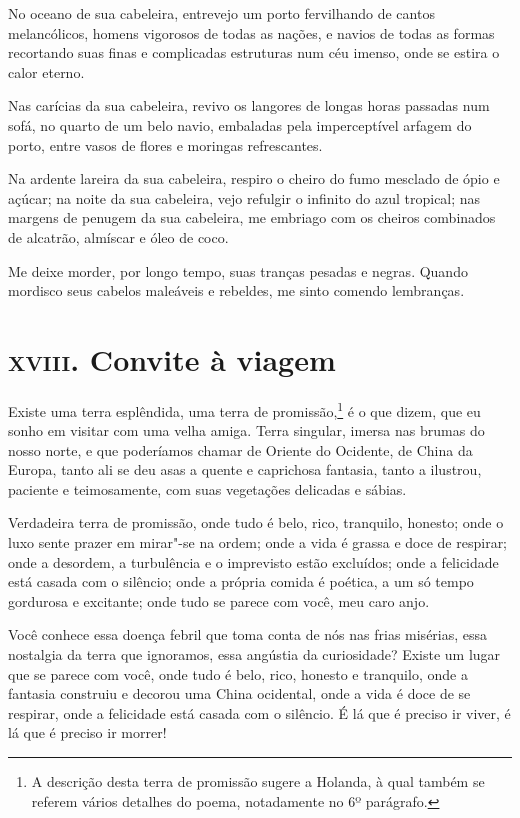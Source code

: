 No oceano de sua cabeleira, entrevejo um porto fervilhando de cantos
melancólicos, homens vigorosos de todas as nações, e navios de todas as
formas recortando suas finas e complicadas estruturas num céu imenso,
onde se estira o calor eterno.

Nas carícias da sua cabeleira, revivo os langores de longas horas
passadas num sofá, no quarto de um belo navio, embaladas pela
imperceptível arfagem do porto, entre vasos de flores e moringas
refrescantes.

Na ardente lareira da sua cabeleira, respiro o cheiro do fumo mesclado
de ópio e açúcar; na noite da sua cabeleira, vejo refulgir o infinito
do azul tropical; nas margens de penugem da sua cabeleira, me embriago
com os cheiros combinados de alcatrão, almíscar e óleo de coco.

Me deixe morder, por longo tempo, suas tranças pesadas e negras. Quando
mordisco seus cabelos maleáveis e rebeldes, me sinto comendo
lembranças.

\chapter{\textsc{xviii.} Convite à viagem}

Existe uma terra esplêndida, uma terra de promissão,\footnote{ 
 A descrição desta terra de promissão sugere a Holanda, à qual também
se referem vários detalhes do poema, notadamente no 6º parágrafo.}
é o que dizem, que eu sonho em visitar com uma velha amiga. Terra
singular, imersa nas brumas do nosso norte, e que poderíamos chamar de
Oriente do Ocidente, de China da Europa, tanto ali se deu asas a
quente e caprichosa fantasia, tanto a ilustrou, paciente e
teimosamente, com suas vegetações delicadas e sábias.

Verdadeira terra de promissão, onde tudo é belo, rico, tranquilo,
honesto; onde o luxo sente prazer em mirar"-se na ordem; onde a vida é
grassa e doce de respirar; onde a desordem, a turbulência e o
imprevisto estão excluídos; onde a felicidade está casada com o
silêncio; onde a própria comida é poética, a um
só tempo gordurosa e excitante; onde tudo se parece com você, meu caro anjo.

Você conhece essa doença febril que toma conta de nós nas frias
misérias, essa nostalgia da terra que ignoramos, essa angústia da
curiosidade? Existe um lugar que se parece com você, onde tudo é
belo, rico, honesto e tranquilo, onde a fantasia construiu e decorou
uma China ocidental, onde a vida é doce de se respirar, onde a
felicidade está casada com o silêncio. É lá que é preciso ir viver, é
lá que é preciso ir morrer!

